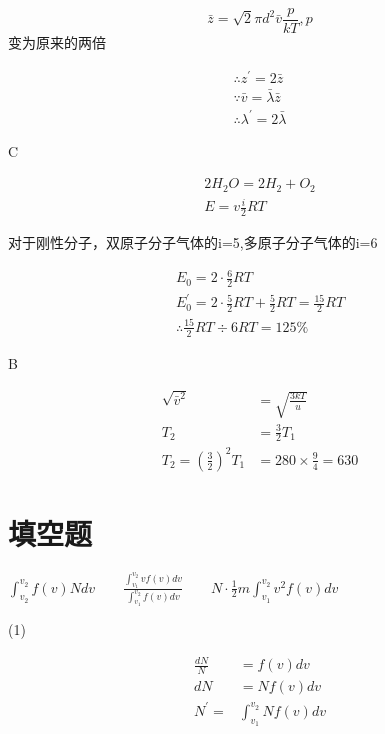 \documentclass[b5paper,opensource]{./template/qyxf-book}
\begin{document}
$$
\bar { z } = \sqrt { 2 } \pi d ^ { 2 } \bar { v } \frac { p } { k T },p
$$变为原来的两倍

$$
\begin{array} { l } { \therefore z ^ { \prime } = 2 \bar { z } } \\ { \because \bar { v } = \bar { \lambda } \bar { z } } \\ { \therefore \lambda ^ { \prime } = 2 \bar { \lambda } } \end{array}
$$

C

\solve

$$
\begin{array} { l } { 2 H _ { 2 } O = 2 H _ { 2 } + O _ { 2 } } \\ { E = v \frac { i } { 2 } R T } \end{array}
$$

对于刚性分子，双原子分子气体的i=5,多原子分子气体的i=6

$$
\begin{array} { l } E _ { 0 } = 2 \cdot \frac { 6 } { 2 } R T \\ E _ { 0 } ^ { \prime } = 2 \cdot \frac { 5 } { 2 } R T + \frac { 5 } { 2 } R T = \frac { 15 } { 2 } R T \\ \therefore \frac { 15 } { 2 } R T \div 6 R T = 125 \% \end{array}
$$

B

\solve

$$
\begin{aligned} \sqrt { \bar { v } ^ { 2 } } & = \sqrt { \frac { 3 k T } { u } } \\ T _ { 2 } & = \frac { 3 } { 2 } T _ { 1 } \\ T _ { 2 } = \left( \frac { 3 } { 2 } \right) ^ { 2 } T _ { 1 } & = 280 \times \frac { 9 } { 4 } = 630 \end{aligned}
$$
\section{填空题}
$
\int _ { v _ { 2 } } ^ { v _ { 2 } } f ( v ) N d v
\qquad
\frac { \int _ { v _ { 1 } } ^ { v _ { 2 } } v f ( v ) d v } { \int _ { v _ { 1 } } ^ { v _ { 2 } } f ( v ) d v }
\qquad
N \cdot \frac { 1 } { 2 } m \int _ { v _ { 1 } } ^ { v _ { 2 } } v ^ { 2 } f ( v ) d v
$

\solve
(1)

$$
\begin{aligned} \frac { d N } { N } & = f ( v ) d v \\ d N & = N f ( v ) d v \\ N ^ { \prime } = & \int _ { v_1 } ^ { v _ { 2 } } N f ( v ) d v \end{aligned}
$$
\end{document}
